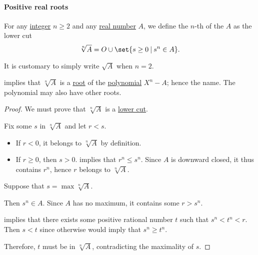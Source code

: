 \paragraph{Positive real roots}

\begin{definition}\label{def:real_nth_root}\mimprovised
  For any \hyperref[def:integers]{integer} \( n \geq 2 \) and any  \hyperref[def:real_numbers]{real number} \( A \), we define the \( n \)-th  of the \( A \) as the lower cut
  \begin{equation}\label{eq:def:real_nth_root}
    \sqrt[n]{ A } = O \cup \set{ s \geq 0 \given s^n \in A }.
  \end{equation}

  It is customary to simply write \( \sqrt{ A } \) when \( n = 2 \).
\end{definition}
\begin{comments}
  \item {} implies that \( \sqrt[n]{ A } \) is a \hyperref[def:polynomial_root]{root} of the \hyperref[def:polynomial_algebra/polynomials]{polynomial} \( X^n - A \); hence the name. The polynomial may also have other roots.
\end{comments}
\begin{proof}
  We must prove that \( \sqrt[n]{ A } \) is a \hyperref[def:lower_cut]{lower cut}.

   Fix some \( s \) in \( \sqrt[n]{ A } \) and let \( r < s \).

  \begin{itemize}
    \item If \( r < 0 \), it belongs to \( \sqrt[n]{ A } \) by definition.

    \item If \( r \geq 0 \), then \( s > 0 \).  implies that \( r^n \leq s^n \). Since \( A \) is downward closed, it thus contains \( r^n \), hence \( r \) belongs to \( \sqrt[n]{ A } \).
  \end{itemize}

   Suppose that \( s = \max \sqrt[n]{ A } \).

  Then \( s^n \in A \). Since \( A \) has no maximum, it contains some \( r > s^n \).

   implies that there exists some positive rational number \( t \) such that \( s^n < t^n < r \). Then \( s < t \) since otherwise  would imply that \( s^n \geq t^n \).

  Therefore, \( t \) must be in \( \sqrt[n]{ A } \), contradicting the maximality of \( s \).
\end{proof}

